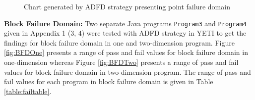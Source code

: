 \begin{figure} [H]
\centering
{}

\bigskip
{}
\bigskip
\caption{Chart generated by ADFD strategy presenting point failure domain}
\end{figure}
\bigskip


\newpage
\noindent \textbf{Block Failure Domain:}  Two separate Java programs \verb+Program3+ and \verb+Program4+ given in Appendix 1 (3, 4) were tested with ADFD strategy in YETI to get the findings for block failure domain in one and two-dimension program. Figure \ref{fig:BFDOne} presents a range of pass and fail values for block failure domain in one-dimension whereas Figure \ref{fig:BFDTwo} presents a range of pass and fail values for block failure domain in two-dimension program. The range of pass and fail values for each program in block failure domain is given in Table \ref{table:failtable}.





